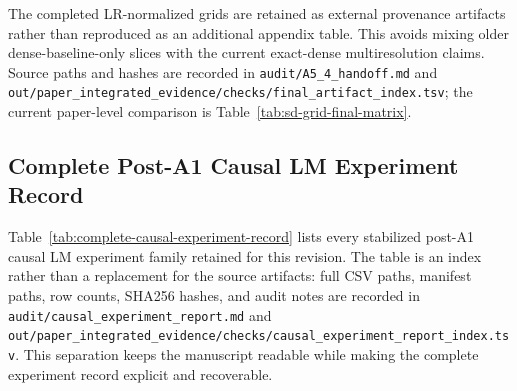 \documentclass{article}
\theoremstyle{plain}
\theoremstyle{definition}
\theoremstyle{remark}
\begin{document}
The completed LR-normalized grids are retained as external provenance artifacts rather than reproduced as an additional appendix table. This avoids mixing older dense-baseline-only slices with the current exact-dense multiresolution claims. Source paths and hashes are recorded in \texttt{audit/A5\_4\_handoff.md} and \texttt{out/paper\_integrated\_evidence/checks/final\_artifact\_index.tsv}; the current paper-level comparison is Table~\ref{tab:sd-grid-final-matrix}.

\subsection{Complete Post-A1 Causal LM Experiment Record}
\label{app:complete-experiment-record}

Table~\ref{tab:complete-causal-experiment-record} lists every stabilized
post-A1 causal LM experiment family retained for this revision.  The table is an
index rather than a replacement for the source artifacts: full CSV paths,
manifest paths, row counts, SHA256 hashes, and audit notes are recorded in
\texttt{audit/causal\_experiment\_report.md} and
\texttt{out/paper\_integrated\_evidence/checks/causal\_experiment\_report\_index.tsv}.
This separation keeps the manuscript readable while making the complete
experiment record explicit and recoverable.
\end{document}

